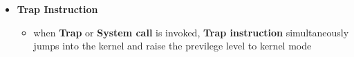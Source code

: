 \documentclass[12pt]{article}
\begin{document}
\begin{enumerate}[1.]
\begin{enumerate}[a)]
\begin{itemize}
            \item \textbf{Trap Instruction}

            \begin{itemize}
                \item when \textbf{Trap} or \textbf{System call} is invoked, \textbf{Trap instruction}
                simultaneously jumps into the kernel and raise the previlege
                level to kernel mode
            \end{itemize}
        \end{itemize}

    \end{enumerate}





\end{enumerate}
\end{document}
